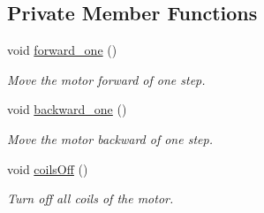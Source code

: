 \subsection*{Private Member Functions}
\begin{DoxyCompactItemize}
\item 
void \hyperlink{class_s_motor_ad8a2e38a5f28bc482c26fc0865a1a421}{forward\+\_\+one} ()
\begin{DoxyCompactList}\small\item\em Move the motor forward of one step. \end{DoxyCompactList}\item 
void \hyperlink{class_s_motor_aa943e06297be50ff2eee785f11a57994}{backward\+\_\+one} ()
\begin{DoxyCompactList}\small\item\em Move the motor backward of one step. \end{DoxyCompactList}\item 
void \hyperlink{class_s_motor_a81c0aec48f08077b5b42fe03034e4f19}{coils\+Off} ()
\begin{DoxyCompactList}\small\item\em Turn off all coils of the motor. \end{DoxyCompactList}\end{DoxyCompactItemize}
